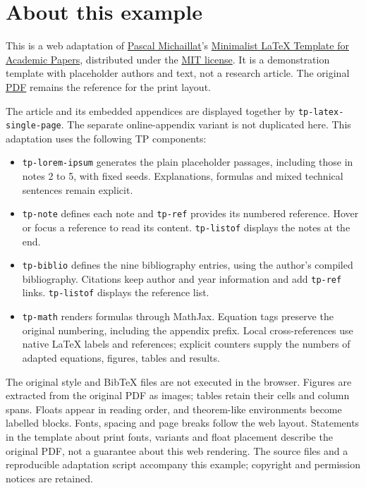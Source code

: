 \documentclass{article}
\begin{document}
\section*{About this example}
This is a web adaptation of \href{https://pascalmichaillat.org}{Pascal Michaillat}'s \href{https://github.com/pmichaillat/latex-paper}{Minimalist LaTeX Template for Academic Papers}, distributed under the \href{https://github.com/pmichaillat/latex-paper/blob/main/LICENSE.md}{MIT license}. It is a demonstration template with placeholder authors and text, not a research article. The original \href{https://pascalmichaillat.org/a.pdf}{PDF} remains the reference for the print layout.

The article and its embedded appendices are displayed together by \texttt{tp-latex-single-page}. The separate online-appendix variant is not duplicated here. This adaptation uses the following TP components:
\begin{itemize}
\item \texttt{tp-lorem-ipsum} generates the plain placeholder passages, including those in notes 2 to 5, with fixed seeds. Explanations, formulas and mixed technical sentences remain explicit.
\item \texttt{tp-note} defines each note and \texttt{tp-ref} provides its numbered reference. Hover or focus a reference to read its content. \texttt{tp-listof} displays the notes at the end.
\item \texttt{tp-biblio} defines the nine bibliography entries, using the author's compiled bibliography. Citations keep author and year information and add \texttt{tp-ref} links. \texttt{tp-listof} displays the reference list.
\item \texttt{tp-math} renders formulas through MathJax. Equation tags preserve the original numbering, including the appendix prefix. Local cross-references use native LaTeX labels and references; explicit counters supply the numbers of adapted equations, figures, tables and results.
\end{itemize}

The original style and BibTeX files are not executed in the browser. Figures are extracted from the original PDF as images; tables retain their cells and column spans. Floats appear in reading order, and theorem-like environments become labelled blocks. Fonts, spacing and page breaks follow the web layout. Statements in the template about print fonts, variants and float placement describe the original PDF, not a guarantee about this web rendering. The source files and a reproducible adaptation script accompany this example; copyright and permission notices are retained.
\end{document}
